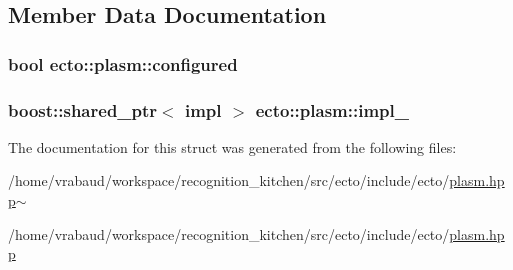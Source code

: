 \subsection{Member Data Documentation}
\hypertarget{structecto_1_1plasm_a8d074da8290587fab0ed04d5cfe3f6b1}{
\subsubsection[{configured}]{\setlength{\rightskip}{0pt plus 5cm}bool ecto\-::plasm\-::configured\hspace{0.3cm}{\ttfamily [private]}}}\label{structecto_1_1plasm_a8d074da8290587fab0ed04d5cfe3f6b1}
\hypertarget{structecto_1_1plasm_a3fa8095e74d8f7b36a5fce7ebcd3e79c}{
\subsubsection[{impl\-\_\-}]{\setlength{\rightskip}{0pt plus 5cm}boost\-::shared\-\_\-ptr$<$ impl $>$ ecto\-::plasm\-::impl\-\_\-\hspace{0.3cm}{\ttfamily [private]}}}\label{structecto_1_1plasm_a3fa8095e74d8f7b36a5fce7ebcd3e79c}


The documentation for this struct was generated from the following files\-:\begin{DoxyCompactItemize}
\item 
/home/vrabaud/workspace/recognition\-\_\-kitchen/src/ecto/include/ecto/\hyperlink{plasm_8hpp~}{plasm.\-hpp$\sim$}\item 
/home/vrabaud/workspace/recognition\-\_\-kitchen/src/ecto/include/ecto/\hyperlink{plasm_8hpp}{plasm.\-hpp}\end{DoxyCompactItemize}
